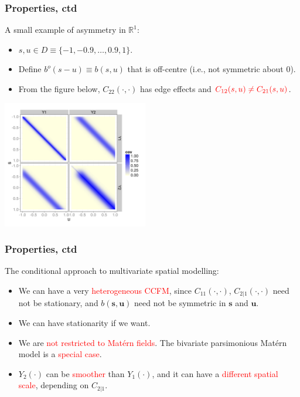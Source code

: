 \documentclass{beamer}
\newcommand{\svec} {\textbf{s}}
\newcommand{\uvec} {\textbf{u}}
\begin{document}

\begin{frame}
\frametitle{Properties, ctd}
\vspace{-.5cm}
A small example of asymmetry in $\mathbb{R}^1$:
\begin{itemize}
\item $s,u \in D\equiv\{-1, -0.9 ,\dots,0.9, 1\}$.
\item Define $b^o(s-u) \equiv b(s,u)$ that is off-centre (i.e., not symmetric about 0).
\item From the figure below, $C_{22}(\cdot,\cdot)$ has edge effects and $\textcolor{red}{C_{12}(s,u)\neq C_{21}(s,u)}$.
\end{itemize}
\vspace{-.9cm}
\begin{center}
\hfill\includegraphics[width=2.5in]{Sigma.png}
\end{center}
\end{frame}


\begin{frame}
\frametitle{Properties, ctd}
The conditional approach to multivariate spatial modelling:
\begin{itemize}
\item We can have a very \textcolor{red}{heterogeneous CCFM}, since $C_{11}(\cdot,\cdot)$, $C_{2|1}(\cdot,\cdot)$ need not be stationary, and $b(\svec,\uvec)$ need not be symmetric in $\svec$ and $\uvec$. \vfill
\item We can have stationarity if we want.\vfill
\item We are \textcolor{red}{not restricted to Matérn fields}. The bivariate parsimonious Matérn model is a \textcolor{red}{special case}.\vfill
\item $Y_2(\cdot)$ can be \textcolor{red}{smoother} than $Y_1(\cdot)$, and it can have a \textcolor{red}{different spatial scale}, depending on $C_{2|1}$.\vfill

\end{itemize}
\end{frame}
\end{document}
